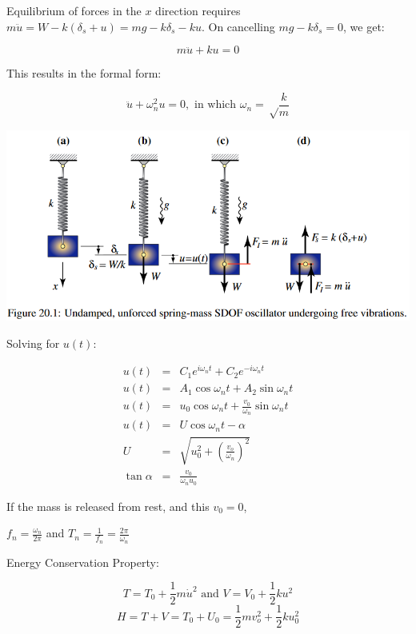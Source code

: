 \documentclass{article}
\begin{document}
\begin{multicols*}{2}
    Equilibrium of forces in the $x$ direction requires $m\ddot{u}=W-k(\delta_s+u)=mg-k\delta_s-ku$.
    On cancelling $mg-k\delta_s=0$, we get:

    $$\boxed{m \ddot{u}+ku=0}$$

    This results in the formal form:\par 
    $$\boxed{\ddot{u}+\omega_n^2u=0, \text{ in which } \omega_n=\sqrt\frac{k}{m}}$$
    
    \includegraphics[width=\linewidth]{Figures/SDOF_Undamped.png}

    Solving for $u(t)$:

    \begin{equation*}
        \begin{array}{lll}
            u(t) & = & C_1e^{i\omega_nt}+C_2e^{-i\omega_nt}\\
            u(t) & = & A_1\cos{\omega_nt}+A_2\sin{\omega_nt}\\
            u(t) & = & u_0\cos{\omega_nt}+\frac{v_0}{\omega_n}\sin{\omega_nt}\\
            u(t) & = & U\cos{\omega_nt-\alpha}\\
            U & = & \sqrt{u_0^2 + \left(\frac{v_o}{\omega_n}\right)^2}\\
            \tan{\alpha} & = & \frac{v_0}{\omega_nu_0}
            
        \end{array}
    \end{equation*}

    If the mass is released from rest, and this $v_0 = 0$,\par 
    \begin{center}
        $f_n=\frac{\omega_n}{2\pi}$ and $T_n=\frac{1}{f_n}=\frac{2\pi}{\omega_n}$
    \end{center}
    
    Energy Conservation Property:\par 
    $$T=T_0+\frac{1}{2}m\dot{u}^2 \text{ and } V=V_0+\frac{1}{2}ku^2$$
    $$H=T+V=T_0+U_0=\frac{1}{2}mv_o^2+\frac{1}{2}ku_0^2$$


\end{multicols*}
\end{document}
